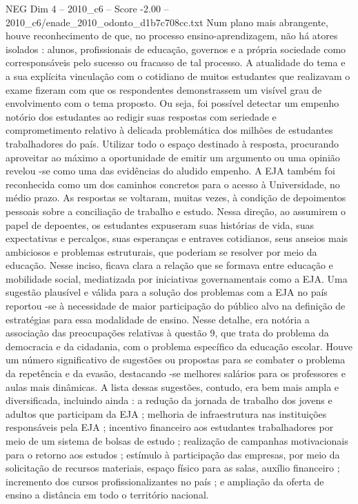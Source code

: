 \begin{textsample}{NEG Dim 4 – 2010\_c6 – Score -2.00 – 2010\_c6/enade\_2010\_odonto\_d1b7c708cc.txt}
Num plano mais abrangente, houve reconhecimento de que, no processo ensino-aprendizagem, não há atores isolados : alunos, profissionais de educação, governos e a própria sociedade como corresponsáveis pelo sucesso ou fracasso de tal processo.
A atualidade do tema e a sua explícita vinculação com o cotidiano de muitos estudantes que realizavam o exame fizeram com que os respondentes demonstrassem um visível grau de envolvimento com o tema proposto.
Ou seja, foi possível detectar um empenho notório dos estudantes ao redigir suas respostas com seriedade e comprometimento relativo à delicada problemática dos milhões de estudantes trabalhadores do país.
Utilizar todo o espaço destinado à resposta, procurando aproveitar ao máximo a oportunidade de emitir um argumento ou uma opinião revelou -se como uma das evidências do aludido empenho.
A EJA também foi reconhecida como um dos caminhos concretos para o acesso à Universidade, no médio prazo.
As respostas se voltaram, muitas vezes, à condição de depoimentos pessoais sobre a conciliação de trabalho e estudo.
Nessa direção, ao assumirem o papel de depoentes, os estudantes expuseram suas histórias de vida, suas expectativas e percalços, suas esperanças e entraves cotidianos, seus anseios mais ambiciosos e problemas estruturais, que poderiam se resolver por meio da educação.
Nesse inciso, ficava clara a relação que se formava entre educação e mobilidade social, mediatizada por iniciativas governamentais como a EJA.
Uma sugestão plausível e válida para a solução dos problemas com a EJA no país reportou -se à necessidade de maior participação do público alvo na definição de estratégias para essa modalidade de ensino.
Nesse detalhe, era notória a associação das preocupações relativas à questão 9, que trata do problema da democracia e da cidadania, com o problema específico da educação escolar.
Houve um número significativo de sugestões ou propostas para se combater o problema da repetência e da evasão, destacando -se melhores salários para os professores e aulas mais dinâmicas.
A lista dessas sugestões, contudo, era bem mais ampla e diversificada, incluindo ainda : a redução da jornada de trabalho dos jovens e adultos que participam da EJA ; melhoria de infraestrutura nas instituições responsáveis pela EJA ; incentivo financeiro aos estudantes trabalhadores por meio de um sistema de bolsas de estudo ; realização de campanhas motivacionais para o retorno aos estudos ; estímulo à participação das empresas, por meio da solicitação de recursos materiais, espaço físico para as salas, auxílio financeiro ; incremento dos cursos profissionalizantes no país ; e ampliação da oferta de ensino a distância em todo o território nacional.

\end{textsample}
